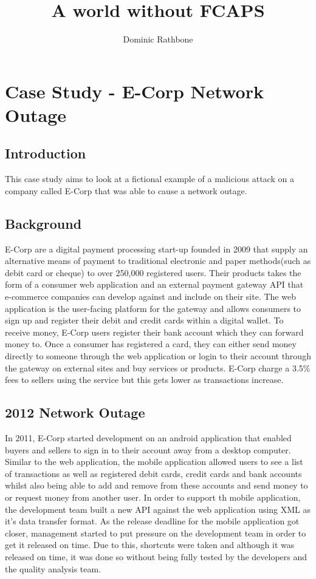 \documentclass[]{report}
\title{A world without FCAPS}
\author{Dominic Rathbone}
\begin{document}
\maketitle

\chapter*{Case Study - E-Corp Network Outage}
\section*{Introduction}
This case study aims to look at a fictional example of a malicious attack on a company called E-Corp that was able to cause a network outage.

\section*{Background}
E-Corp are a digital payment processing start-up founded in 2009 that supply an alternative means of payment to traditional electronic and paper methods(such as debit card or cheque) to over 250,000 registered users. Their products takes the form of a consumer web application and an external payment gateway API that e-commerce companies can develop against and include on their site. The web application is the user-facing platform for the gateway and allows consumers to sign up and register their debit and credit cards within a digital wallet. To receive money, E-Corp users register their bank account which they can forward money to. Once a consumer has registered a card, they can either send money directly to someone through the web application or login to their account through the gateway on external sites and buy services or products. E-Corp charge a 3.5\% fees to sellers using the service but this gets lower as transactions increase. 
	
\section*{2012 Network Outage}
In 2011, E-Corp started development on an android application that enabled buyers and sellers to sign in to their account away from a desktop computer. Similar to the web application, the mobile application allowed users to see a list of transactions as well as registered debit cards, credit cards and bank accounts whilst also being able to add and remove from these accounts and send money to or request money from another user. In order to support th mobile application, the development team built a new API against the web application using XML as it's data transfer format. As the release deadline for the mobile application got closer, management started to put pressure on the development team in order to get it released on time. Due to this, shortcuts were taken and although it was released on time, it was done so without being fully tested by the developers and the quality analysis team.
	
\end{document}
